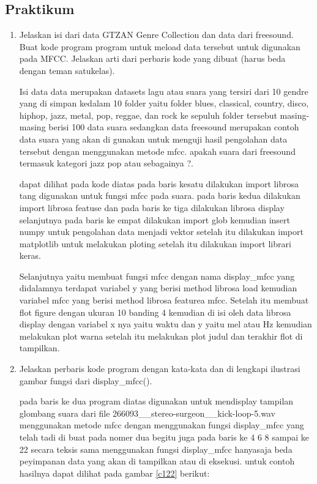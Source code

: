 \subsection{Praktikum}
\begin{enumerate}
\item Jelaskan isi dari data GTZAN Genre Collection dan data dari freesound. Buat kode program program untuk meload data tersebut untuk digunakan pada MFCC. Jelaskan arti dari perbaris kode yang dibuat (harus beda dengan teman satukelas).\par
\subitem Isi data data merupakan datasets lagu atau suara yang tersiri dari 10 gendre yang di simpan kedalam 10 folder yaitu folder blues, classical, country, disco, hiphop, jazz, metal, pop, reggae, dan rock ke sepuluh folder tersebut masing-masing  berisi 100 data suara sedangkan data freesound merupakan contoh data suara yang akan di gunakan untuk menguji hasil pengolahan data tersebut dengan menggunakan metode mfcc. apakah suara dari freesound termasuk kategori jazz pop atau sebagainya ?.



\subitem dapat dilihat pada kode diatas pada baris kesatu dilakukan import librosa tang digunakan untuk fungsi mfcc pada suara.
pada baris kedua dilakukan import librosa featuse dan pada baris ke tiga dilakukan librosa display selanjutnya pada baris ke empat dilakukan import glob kemudian insert numpy untuk pengolahan data menjadi vektor setelah itu dilakukan import matplotlib untuk melakukan ploting setelah itu dilakukan import librari keras.\par

\subitem Selanjutnya yaitu membuat fungsi mfcc dengan nama display\_mfcc yang didalamnya terdapat variabel y yang berisi method librosa load kemudian variabel mfcc yang berisi method librosa featurea mfcc. Setelah itu membuat flot figure dengan ukuran 10 banding 4 kemudian di isi oleh data librosa display dengan variabel x nya yaitu waktu dan y yaitu mel atau Hz kemudian melakukan plot warna setelah itu melakukan plot judul dan terakhir flot di tampilkan. 

\item Jelaskan perbaris kode program dengan kata-kata dan di lengkapi ilustrasi gambar fungsi dari display\_mfcc().\par



\subitem pada baris ke dua program diatas digunakan untuk mendisplay tampilan glombang suara dari file 266093\_\_stereo-surgeon\_\_kick-loop-5.wav menggunakan metode mfcc dengan menggunakan fungsi display\_mfcc yang telah tadi di buat pada nomer dua begitu juga pada baris ke 4 6 8 sampai ke 22 secara teksis sama menggunakan fungsi display\_mfcc hanyasaja beda peyimpanan data yang akan di tampilkan atau di eksekusi. untuk contoh hasilnya dapat dilihat pada gambar \ref{c122} berikut:


\end{enumerate}

